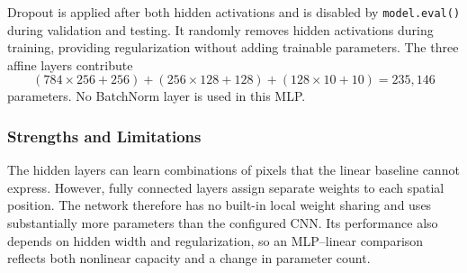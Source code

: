 Dropout is applied after both hidden activations and is disabled by \texttt{model.eval()} during validation and testing. It randomly removes hidden activations during training, providing regularization without adding trainable parameters. The three affine layers contribute
\begin{equation}
    (784\times256+256)+(256\times128+128)+(128\times10+10)
    =235{,}146
\end{equation}
parameters. No BatchNorm layer is used in this MLP.

\subsubsection{Strengths and Limitations}

The hidden layers can learn combinations of pixels that the linear baseline cannot express. However, fully connected layers assign separate weights to each spatial position. The network therefore has no built-in local weight sharing and uses substantially more parameters than the configured CNN. Its performance also depends on hidden width and regularization, so an MLP--linear comparison reflects both nonlinear capacity and a change in parameter count.
